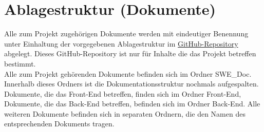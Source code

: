 
\chapter{Ablagestruktur (Dokumente)}

Alle zum Projekt zugehörigen Dokumente werden mit eindeutiger Benennung unter Einhaltung der vorgegebenen Ablagestruktur im \href{https://github.com/LucRome/SWE_Semester4}{GitHub-Repository} abgelegt. Dieses \gls{GitHub}-\gls{Repository} ist nur für Inhalte die das Projekt betreffen bestimmt.\\

Alle zum Projekt gehörenden Dokumente befinden sich im Ordner \glqq SWE\_Doc\grqq. \\
Innerhalb dieses Ordners ist die Dokumentationsstruktur nochmals aufgespalten. Dokumente, die das \gls{Front-End} betreffen, finden sich im Ordner \glqq \gls{Front-End}\grqq , Dokumente, die das \gls{Back-End} betreffen, befinden sich im Ordner \glqq \gls{Back-End}\grqq. Alle weiteren Dokumente befinden sich in separaten Ordnern, die den Namen des entsprechenden Dokuments tragen.\\
